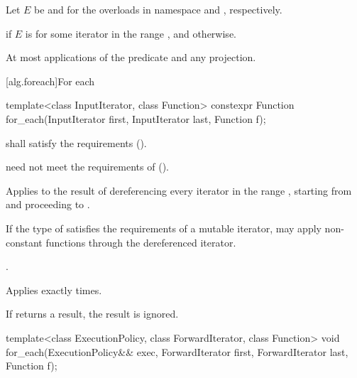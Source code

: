 \begin{itemdescr}
\pnum
Let $E$ be  and 
for the overloads in namespace  and , respectively.

\pnum
\returns
{} if $E$ is 
for some iterator  in the range , and
 otherwise.

\pnum
\complexity
At most  applications of the predicate and any projection.
\end{itemdescr}

[alg.foreach]{For each}

%
\begin{itemdecl}
template<class InputIterator, class Function>
  constexpr Function for_each(InputIterator first, InputIterator last, Function f);
\end{itemdecl}

\begin{itemdescr}
\pnum
\requires
{} shall satisfy
the  requirements ().
\begin{note}
 need not meet the requirements of
 ().
\end{note}

\pnum
\effects
Applies  to the result of dereferencing
every iterator in the range ,
starting from  and proceeding to .
\begin{note}
If the type of  satisfies the requirements of a mutable iterator,
 may apply non-constant functions through the dereferenced iterator.
\end{note}

\pnum
\returns
{}.

\pnum
\complexity
Applies  exactly  times.

\pnum
\remarks
If  returns a result, the result is ignored.
\end{itemdescr}

%
\begin{itemdecl}
template<class ExecutionPolicy, class ForwardIterator, class Function>
  void for_each(ExecutionPolicy&& exec,
                ForwardIterator first, ForwardIterator last,
                Function f);
\end{itemdecl}

